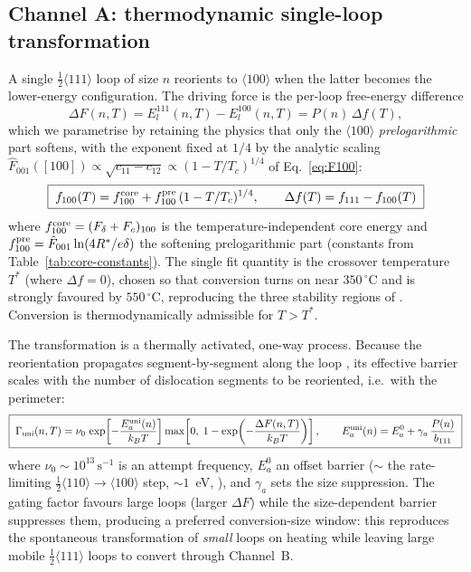 \subsection{Channel A: thermodynamic single-loop transformation}
\label{sec:channel-A}

A single $\tfrac12\langle111\rangle$ loop of size $n$ reorients to
$\langle100\rangle$ when the latter becomes the lower-energy configuration.  The
driving force is the per-loop free-energy difference
\begin{equation}
  \Delta F(n,T) = E_l^{111}(n,T) - E_l^{100}(n,T) = P(n)\,\Delta f(T),
  \label{eq:driving-force}
\end{equation}
which we parametrise by retaining the physics that only the $\langle100\rangle$
\emph{prelogarithmic} part softens, with the exponent fixed at $1/4$ by the
analytic scaling $\hat F_{001}([100])\propto\sqrt{c_{11}-c_{12}}\propto
(1-T/T_c)^{1/4}$ of Eq.~\eqref{eq:F100}:
\begin{equation}
  \boxed{\;f_{100}(T) = f_{100}^{\rm core} + f_{100}^{\rm pre}\,(1-T/T_c)^{1/4},
  \qquad \Delta f(T) = f_{111} - f_{100}(T)\;}
  \label{eq:delta-f}
\end{equation}
where $f_{100}^{\rm core}=(F_\delta+F_c)_{100}$ is the temperature-independent
core energy and $f_{100}^{\rm pre}=\hat F_{001}\ln(4R^\ast/e\delta)$ the softening
prelogarithmic part (constants from Table~\ref{tab:core-constants}).  The single
fit quantity is the crossover temperature $T^\ast$ (where $\Delta f=0$), chosen
so that conversion turns on near $350\,^\circ$C and is strongly favoured by
$550\,^\circ$C, reproducing the three stability regions of \citet{Dudarev2008}.
Conversion is thermodynamically admissible for $T>T^\ast$.

The transformation is a thermally activated, one-way process.  Because the
reorientation propagates segment-by-segment along the loop
\citep{Marian2002}, its effective barrier scales with the number of dislocation
segments to be reoriented, i.e.\ with the perimeter:
\begin{equation}
  \boxed{\;\Gamma_{\rm uni}(n,T) = \nu_0\,
    \exp\!\left[-\frac{E_a^{\rm uni}(n)}{k_BT}\right]
    \max\!\left[0,\;1-\exp\!\left(-\frac{\Delta F(n,T)}{k_BT}\right)\right],\qquad
    E_a^{\rm uni}(n) = E_a^{0} + \gamma_a\,\frac{P(n)}{b_{111}}\;}
  \label{eq:gamma-uni}
\end{equation}
where $\nu_0\sim10^{13}\,\mathrm{s}^{-1}$ is an attempt frequency, $E_a^{0}$ an
offset barrier ($\sim$ the rate-limiting $\tfrac12\langle110\rangle\!\to\!\langle100\rangle$
step, $\sim1$~eV, \citealp{Marian2002}), and $\gamma_a$ sets the size
suppression.  The gating factor favours large loops (larger $\Delta F$) while the
size-dependent barrier suppresses them, producing a preferred conversion-size
window: this reproduces the spontaneous transformation of \emph{small} loops on
heating \citep{Arakawa2006} while leaving large mobile $\tfrac12\langle111\rangle$
loops to convert through Channel~B.

